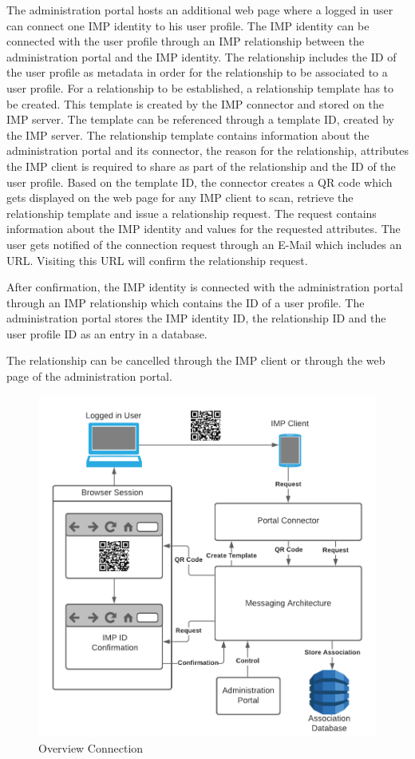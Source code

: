 \documentclass[
     12pt,         %
     a4paper,      %
     BCOR=10mm,version=first,     %
     DIV=14,version=first,        %
     ]{scrreprt}
\begin{document}
The administration portal hosts an additional web page where a logged in user can connect one IMP identity to his user profile. The IMP identity can be connected with the user profile through an IMP relationship between the administration portal and the IMP identity. The relationship includes the ID of the user profile as metadata in order for the relationship to be associated to a user profile. For a relationship to be established, a relationship template has to be created. This template is created by the IMP connector and stored on the IMP server. The template can be referenced through a template ID, created by the IMP server. The relationship template contains information about the administration portal and its connector, the reason for the relationship, attributes the IMP client is required to share as part of the relationship and the ID of the user profile. Based on the template ID, the connector creates a QR code which gets displayed on the web page for any IMP client to scan, retrieve the relationship template and issue a relationship request. The request contains information about the IMP identity and values for the requested attributes. The user gets notified of the connection request through an E-Mail which includes an URL. Visiting this URL will confirm the relationship request.

After confirmation, the IMP identity is connected with the administration portal through an IMP relationship which contains the ID of a user profile. The administration portal stores the IMP identity ID, the relationship ID and the user profile ID as an entry in a database.

The relationship can be cancelled through the IMP client or through the web page of the administration portal.

\begin{figure}[h]
\caption{Overview Connection}
    \centering
    \includegraphics[scale=0.3]{Diagrams/Integration 1/Connection/Overview.png}
\end{figure}
\end{document}
